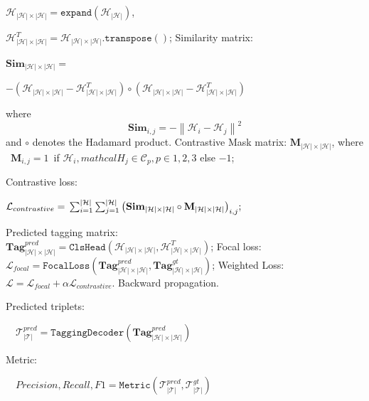 \documentclass[11pt]{article}
\begin{document}
\begin{algorithm}[!ht]
\begin{algorithmic}[1]
 $\mathcal{H}_{|\mathcal{H}|\times |\mathcal{H}|}=\texttt{expand}(\mathcal{H}_{|\mathcal{H}|})$, 

 $\mathcal{H}_{|\mathcal{H}|\times |\mathcal{H}|}^T=\mathcal{H}_{|\mathcal{H}|\times |\mathcal{H}|}.\texttt{transpose}()$;
\STATE Similarity matrix: 

$\mathbf{Sim}_{|\mathcal{H}|\times |\mathcal{H}|}=$


$- (\mathcal{H}_{|\mathcal{H}|\times |\mathcal{H}|}-\mathcal{H}_{|\mathcal{H}|\times |\mathcal{H}|}^T) \circ (\mathcal{H}_{|\mathcal{H}|\times |\mathcal{H}|}-\mathcal{H}_{|\mathcal{H}|\times |\mathcal{H}|}^T)$


where 
\[
\mathbf{Sim}_{i, j} = -\left\lVert \mathcal{H}_i - \mathcal{H}_j \right\rVert^2
\]
and $\circ$ denotes the Hadamard product.
\STATE Contrastive Mask matrix: $\mathbf{M}_{|\mathcal{H}|\times |\mathcal{H}|}$, where \  $\mathbf{M}_{i, j} = 1$\ if 
$\mathcal{H}_i, mathcal{H}_j\in \mathcal{C}_p, p\in{1, 2 , 3}$ %
else $-1$;

\STATE Contrastive loss: 

$\mathcal{L}_{contrastive}=\newline \sum_{i=1}^{|\mathcal{H}|}\sum_{j=1}^{|\mathcal{H}|}\big(\mathbf{Sim_{|\mathcal{H}|\times|\mathcal{H}|}} \circ \mathbf{M_{|\mathcal{H}|\times|\mathcal{H}|}}\big)_{i, j};$

\STATE Predicted tagging matrix: \\
$\mathbf{Tag}_{|\mathcal{H}|\times |\mathcal{H}|}^{pred}=\texttt{ClsHead}(\mathcal{H}_{|\mathcal{H}|\times |\mathcal{H}|}, \mathcal{H}_{|\mathcal{H}|\times |\mathcal{H}|}^T)$;
\STATE Focal loss: \\
$\mathcal{L}_{focal} = \texttt{FocalLoss}(\mathbf{Tag}_{|\mathcal{H}|\times |\mathcal{H}|}^{pred}, \mathbf{Tag}_{|\mathcal{H}|\times |\mathcal{H}|}^{gt})$;
\STATE Weighted Loss: $\mathcal{L}=\mathcal{L}_{focal} + \alpha \mathcal{L}_{contrastive}$.
\STATE Backward propagation.

\end{algorithmic}

Predicted triplets: 

\ \ $\mathcal{T}_{|\mathcal{T}|}^{pred}=\texttt{TaggingDecoder}(\mathbf{Tag}_{|\mathcal{H}|\times |\mathcal{H}|}^{pred})$

Metric:

\ \ $\mathit{Precision}, \mathit{Recall}, \mathit{F1} = \texttt{Metric}( \mathcal{T}_{|\mathcal{T}|}^{pred}, \mathcal{T}_{|\mathcal{T}|}^{gt})$

\label{alg:training}
\end{algorithm}
\end{document}
